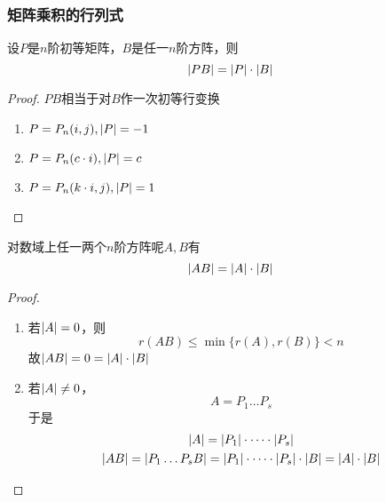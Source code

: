 \documentclass[11pt]{article}
\begin{document}
\subsubsection{矩阵乘积的行列式}
\label{sec:orgb34ae66}
\begin{proposition}[]
设\(P\)是\(n\)阶初等矩阵，\(B\)是任一\(n\)阶方阵，则
\begin{equation*}
\abs{PB}=\abs{P}\cdot\abs{B}
\end{equation*}
\end{proposition}

\begin{proof}
\(PB\)相当于对\(B\)作一次初等行变换
\begin{enumerate}
\item \(P=P_n(i,j),\abs{P}=-1\)
\item \(P=P_n(c\cdot i),\abs{P}=c\)
\item \(P=P_n(k\cdot i,j),\abs{P}=1\)
\end{enumerate}
\end{proof}

\begin{theorem}[]
对数域上任一两个\(n\)阶方阵呢\(A,B\)有
\begin{equation*}
\abs{AB}=\abs{A}\cdot\abs{B}
\end{equation*}
\end{theorem}
\begin{proof}
\begin{enumerate}
\item 若\(\abs{A}=0\)，则
\begin{equation*}
r(AB)\le\min\{r(A),r(B)\}<n
\end{equation*}
故\(\abs{AB}=0=\abs{A}\cdot\abs{B}\)
\item 若\(\abs{A}\neq0\)，
\begin{equation*}
A=P_1\dots P_s
\end{equation*}
于是
\begin{gather*}
\abs{A}=\abs{P_1}\cdot\dots\cdot\abs{P_s}\\
\abs{AB}=\abs{P_1\dots P_sB}=\abs{P_1}\cdot\dots\cdot\abs{P_s}\cdot\abs{B}=\abs{A}\cdot\abs{B}
\end{gather*}
\end{enumerate}
\end{proof}
\end{document}
